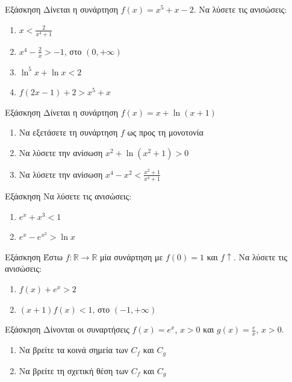 \documentclass[greek]{beamer}
\begin{document}
\begin{frame}{Εξάσκηση}
      Δίνεται η συνάρτηση $f(x)=x^5+x-2$. Να λύσετε τις ανισώσεις:
      \begin{enumerate}
            \item $x<\frac{2}{x^4+1}$ \pause
            \item $x^4-\frac{2}{x}>-1$, στο $(0,+\infty)$ \pause
            \item $\ln^5 x+\ln x<2$ \pause
            \item $f(2x-1)+2>x^5+x$
      \end{enumerate}
\end{frame}

\begin{frame}{Εξάσκηση}
      Δίνεται η συνάρτηση $f(x)=x+\ln (x+1)$
      \begin{enumerate}
            \item Να εξετάσετε τη συνάρτηση $f$ ως προς τη μονοτονία \pause
            \item Να λύσετε την ανίσωση $x^2+\ln (x^2+1)>0$ \pause
            \item Να λύσετε την ανίσωση $x^4-x^2<\frac{x^2+1}{x^4+1}$
      \end{enumerate}
\end{frame}

\begin{frame}{Εξάσκηση}
      Να λύσετε τις ανισώσεις:
      \begin{enumerate}
            \item $e^x+x^3<1$ \pause
            \item $e^x-e^{x^2}>\ln x$
      \end{enumerate}
\end{frame}

\begin{frame}{Εξάσκηση}
      Έστω $f:\mathbb{R}\to\mathbb{R}$ μία συνάρτηση με $f(0)=1$ και $f\uparrow$. Να λύσετε τις ανισώσεις:
      \begin{enumerate}
            \item $f(x)+e^x>2$ \pause
            \item $(x+1)f(x)<1$, στο $(-1,+\infty)$
      \end{enumerate}
\end{frame}

\begin{frame}{Εξάσκηση}
      Δίνονται οι συναρτήσεις $f(x)=e^x$, $x>0$ και $g(x)=\frac{e}{x}$, $x>0$.
      \begin{enumerate}
            \item Να βρείτε τα κοινά σημεία των $C_f$ και $C_g$ \pause
            \item Να βρείτε τη σχετική θέση των $C_f$ και $C_g$
      \end{enumerate}
\end{frame}
\end{document}
